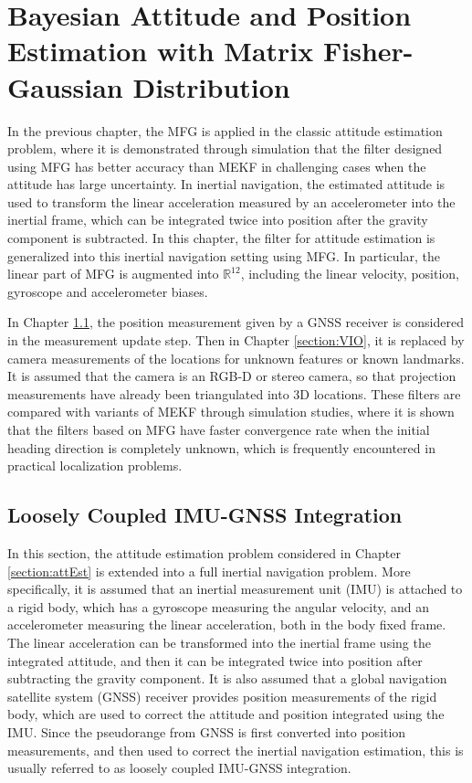 
\chapter{Bayesian Attitude and Position Estimation with Matrix Fisher-Gaussian Distribution} \label{chap:pose-estimation}

In the previous chapter, the MFG is applied in the classic attitude estimation problem, where it is demonstrated through simulation that the filter designed using MFG has better accuracy than MEKF in challenging cases when the attitude has large uncertainty.
In inertial navigation, the estimated attitude is used to transform the linear acceleration measured by an accelerometer into the inertial frame, which can be integrated twice into position after the gravity component is subtracted.
In this chapter, the filter for attitude estimation is generalized into this inertial navigation setting using MFG.
In particular, the linear part of MFG is augmented into $\mathbb{R}^{12}$, including the linear velocity, position, gyroscope and accelerometer biases.

In Chapter \ref{section:posEst}, the position measurement given by a GNSS receiver is considered in the measurement update step.
Then in Chapter \ref{section:VIO}, it is replaced by camera measurements of the locations for unknown features or known landmarks.
It is assumed that the camera is an RGB-D or stereo camera, so that projection measurements have already been triangulated into 3D locations.
These filters are compared with variants of MEKF \cite{sola2017quaternion} through simulation studies, where it is shown that the filters based on MFG have faster convergence rate when the initial heading direction is completely unknown, which is frequently encountered in practical localization problems.

\section{Loosely Coupled IMU-GNSS Integration} \label{section:posEst}

In this section, the attitude estimation problem considered in Chapter \ref{section:attEst} is extended into a full inertial navigation problem.
More specifically, it is assumed that an inertial measurement unit (IMU) is attached to a rigid body, which has a gyroscope measuring the angular velocity, and an accelerometer measuring the linear acceleration, both in the body fixed frame.
The linear acceleration can be transformed into the inertial frame using the integrated attitude, and then it can be integrated twice into position after subtracting the gravity component.
It is also assumed that a global navigation satellite system (GNSS) receiver provides position measurements of the rigid body, which are used to correct the attitude and position integrated using the IMU.
Since the pseudorange from GNSS is first converted into position measurements, and then used to correct the inertial navigation estimation, this is usually referred to as loosely coupled IMU-GNSS integration.

